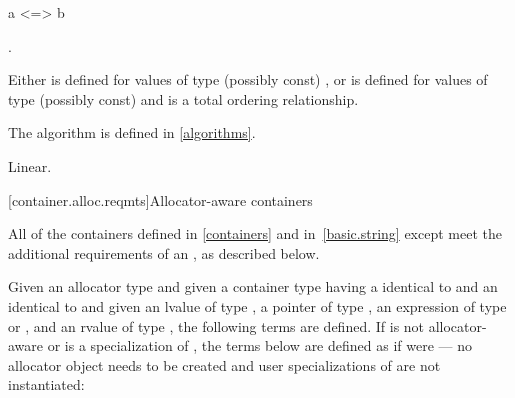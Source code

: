 \begin{itemdecl}
a <=> b
\end{itemdecl}

\begin{itemdescr}
\pnum
\result
{}.

\pnum
\expects
Either \tcode{<=>} is defined for values of type (possibly const) ,
or \tcode{<} is defined for values of type (possibly const)  and
\tcode{<} is a total ordering relationship.

\pnum
\returns
{}
\begin{note}
The algorithm 
is defined in \ref{algorithms}.
\end{note}

\pnum
\complexity
Linear.
\end{itemdescr}

[container.alloc.reqmts]{Allocator-aware containers}

\pnum
All of the containers defined in \ref{containers} and in~\ref{basic.string} except 
meet the additional requirements of an ,
as described below.

\pnum
Given an allocator type 
and given a container type  having a  identical to 
and an  identical to 
and given an lvalue  of type ,
a pointer  of type ,
an expression  of type  or ,
and an rvalue  of type ,
the following terms are defined. If 
is not allocator-aware or is a specialization of ,
the terms below are defined as if  were
 --- no allocator object needs to be created
and user specializations of  are not instantiated:

